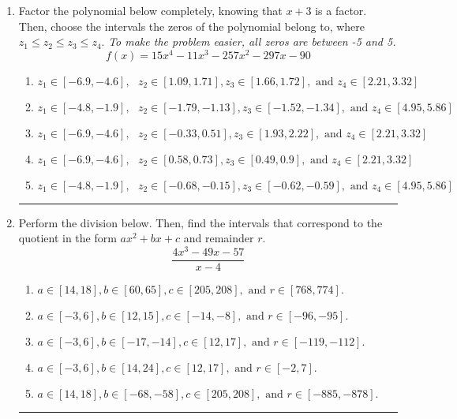 \documentclass[14pt]{extbook}
\newcommand{\litem}[1]{\item#1\hspace*{-1cm}\rule{\textwidth}{0.4pt}}
\begin{document}
\begin{enumerate}
{\begin{enumerate}[label=\Alph*.]
\end{enumerate} }
\litem{
Factor the polynomial below completely, knowing that $x+3$ is a factor. Then, choose the intervals the zeros of the polynomial belong to, where $z_1 \leq z_2 \leq z_3 \leq z_4$. \textit{To make the problem easier, all zeros are between -5 and 5.}\[ f(x) = 15x^{4} -11 x^{3} -257 x^{2} -297 x -90 \]\begin{enumerate}[label=\Alph*.]
\item \( z_1 \in [-6.9, -4.6], \text{   }  z_2 \in [1.09, 1.71], z_3 \in [1.66, 1.72], \text{   and   } z_4 \in [2.21, 3.32] \)
\item \( z_1 \in [-4.8, -1.9], \text{   }  z_2 \in [-1.79, -1.13], z_3 \in [-1.52, -1.34], \text{   and   } z_4 \in [4.95, 5.86] \)
\item \( z_1 \in [-6.9, -4.6], \text{   }  z_2 \in [-0.33, 0.51], z_3 \in [1.93, 2.22], \text{   and   } z_4 \in [2.21, 3.32] \)
\item \( z_1 \in [-6.9, -4.6], \text{   }  z_2 \in [0.58, 0.73], z_3 \in [0.49, 0.9], \text{   and   } z_4 \in [2.21, 3.32] \)
\item \( z_1 \in [-4.8, -1.9], \text{   }  z_2 \in [-0.68, -0.15], z_3 \in [-0.62, -0.59], \text{   and   } z_4 \in [4.95, 5.86] \)

\end{enumerate} }
\litem{
Perform the division below. Then, find the intervals that correspond to the quotient in the form $ax^2+bx+c$ and remainder $r$.\[ \frac{4x^{3} -49 x -57}{x -4} \]\begin{enumerate}[label=\Alph*.]
\item \( a \in [14, 18], b \in [60, 65], c \in [205, 208], \text{ and } r \in [768, 774]. \)
\item \( a \in [-3, 6], b \in [12, 15], c \in [-14, -8], \text{ and } r \in [-96, -95]. \)
\item \( a \in [-3, 6], b \in [-17, -14], c \in [12, 17], \text{ and } r \in [-119, -112]. \)
\item \( a \in [-3, 6], b \in [14, 24], c \in [12, 17], \text{ and } r \in [-2, 7]. \)
\item \( a \in [14, 18], b \in [-68, -58], c \in [205, 208], \text{ and } r \in [-885, -878]. \)


\end{enumerate}}
\end{enumerate}
\end{document}
